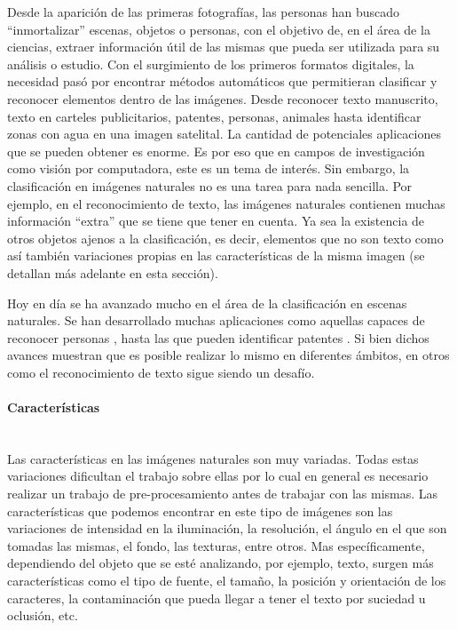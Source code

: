 	Desde la aparición de las primeras fotografías, las personas han buscado ``inmortalizar'' escenas, objetos o personas, con el objetivo de, en el área de la ciencias, extraer información útil de las mismas que pueda ser utilizada para su análisis o estudio. Con el surgimiento de los primeros formatos digitales, la necesidad pasó por encontrar métodos automáticos que permitieran clasificar y reconocer elementos dentro de las imágenes. Desde reconocer texto manuscrito, texto en carteles publicitarios, patentes, personas, animales hasta identificar zonas con agua en una imagen satelital. La cantidad de potenciales aplicaciones que se pueden obtener es enorme. Es por eso que en campos de investigación como visión por computadora, este es un tema de interés. Sin embargo, la clasificación en imágenes naturales no es una tarea para nada sencilla. Por ejemplo, en el reconocimiento de texto, las imágenes naturales contienen muchas información ``extra'' que se tiene que tener en cuenta. Ya sea la existencia de otros objetos ajenos a la clasificación, es decir, elementos que no son texto como así también variaciones propias en las características de la misma imagen (se detallan más adelante en esta sección).
	
	Hoy en día se ha avanzado mucho en el área de la clasificación en escenas naturales. Se han desarrollado muchas aplicaciones como aquellas capaces de reconocer personas \cite{DT05}, hasta las que pueden identificar patentes \cite{DAB}. Si bien dichos avances muestran que es posible realizar lo mismo en diferentes ámbitos, en otros como el reconocimiento de texto sigue siendo un desafío.
	
	
\paragraph{Características} ~\\
	
	Las características en las imágenes naturales son muy variadas. Todas estas variaciones dificultan el trabajo sobre ellas por lo cual en general es necesario realizar un trabajo de pre-procesamiento antes de trabajar con las mismas. Las características que podemos encontrar en este tipo de imágenes son las variaciones de intensidad en la iluminación, la resolución, el ángulo en el que son tomadas las mismas, el fondo, las texturas, entre otros. Mas específicamente, dependiendo del objeto que se esté analizando, por ejemplo, texto, surgen más características como el tipo de fuente, el tamaño, la posición y orientación de los caracteres, la contaminación que pueda llegar a tener el texto por suciedad u oclusión, etc.
	
